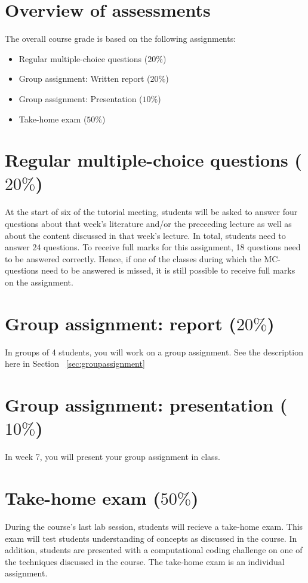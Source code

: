 \documentclass[a4paper,10pt,twocolumn]{report}
\begin{document}
	\section{Overview of assessments}
	The overall course grade is based on the following assignments:
	\begin{itemize}
		\item Regular multiple-choice questions (\(20\%\))
		\item Group assignment: Written report (\(20\%\))
		\item Group assignment: Presentation (\(10\%\))
		\item Take-home exam (\(50\%\))
	\end{itemize}

	
	\section{Regular multiple-choice questions ($20\%$)}
At the start of six of the tutorial meeting, students will be asked to answer four questions about that week's literature and/or the preceeding lecture as well as about the content discussed in that week's lecture. In total, students need to answer 24 questions. To receive full marks for this assignment, 18 questions need to be answered correctly. Hence, if one of the classes during which the MC-questions need to be answered is missed, it is still possible to receive full marks on the assignment. 
	
	\section{Group assignment: report ($20\%$)}
In groups of 4 students, you will work on a group assignment. See the description here in Section ~\ref{sec:groupassignment}
	
	\section{Group assignment: presentation ($10\%$)}
In week 7, you will present your group assignment in class. 
	
	\section{Take-home exam ($50\%$)}
	During the course's last lab session, students will recieve a take-home exam. This exam will test students understanding of concepts as discussed in the course. In addition, students are presented with a computational coding challenge on one of the techniques discussed in the course. The take-home exam is an individual assignment.
\end{document}
